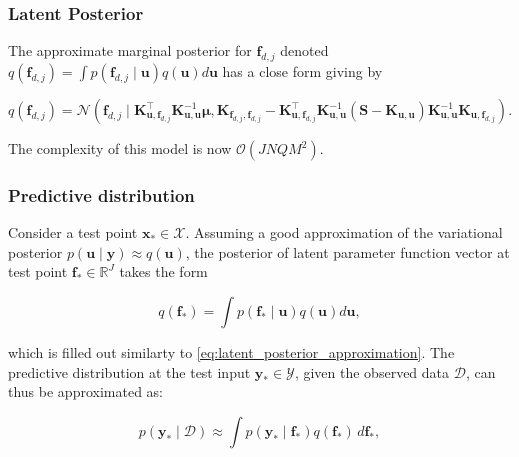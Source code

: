 \subsubsection{Latent Posterior}

The approximate marginal posterior for $\boldsymbol{f}_{d,j}$ denoted $q(\boldsymbol{f}_{d,j}) = \int p(\mathbf{f}_{d,j} \mid \boldsymbol{u})q(\boldsymbol{u})d\boldsymbol{u}$ has a close form giving by 

\begin{equation}\label{eq:latent_posterior_approximation}
	q(\boldsymbol{f}_{d,j}) = \mathcal{N}\left(\boldsymbol{f}_{d,j} \mid \boldsymbol{K}_{\boldsymbol{u}, \boldsymbol{f}_{d,j}}^\top \boldsymbol{K}_{\boldsymbol{u}, \boldsymbol{u}}^{-1} \boldsymbol{\mu}, \boldsymbol{K}_{\boldsymbol{f}_{d,j}, \boldsymbol{f}_{d,j}} - \mathbf{K}_{\boldsymbol{u}, \boldsymbol{f}_{d,j}}^\top \boldsymbol{K}_{\boldsymbol{u}, \boldsymbol{u}}^{-1} (\boldsymbol{S} - \boldsymbol{K}_{\boldsymbol{u}, \mathbf{u}}) \mathbf{K}_{\mathbf{u}, \boldsymbol{u}}^{-1} \boldsymbol{K}_{\boldsymbol{u}, \boldsymbol{f}_{d,j}} \right).
\end{equation}

The complexity of this model is now \( \mathcal{O}(JNQM^2) \).

\subsubsection{Predictive distribution}

Consider a test point \( \boldsymbol{x}_{*} \in \mathcal{X} \). Assuming a good approximation of the variational posterior $p(\mathbf{u} \mid \mathbf{y}) \approx q(\mathbf{u})$, the posterior of latent parameter function vector at test point \( \boldsymbol{f}_* \in \mathbb{R}^{J} \) takes the form

\begin{equation}
	q(\boldsymbol{f}_*) = \int p(\boldsymbol{f}_* \mid \boldsymbol{u}) q(\boldsymbol{u}) d\boldsymbol{u},
\end{equation}

which is filled out similarty to \cref{eq:latent_posterior_approximation}. The predictive distribution at the test input \( \boldsymbol{y}_* \in \mathcal{Y} \), given the observed data \( \mathcal{D} \), can thus be approximated as:

\begin{equation}\label{eq;predictive_distribution}
	p(\boldsymbol{y}_* \mid \mathcal{D}) \approx \int p(\boldsymbol{y}_* \mid \boldsymbol{f}_*) q(\boldsymbol{f}_*) \, d\boldsymbol{f}_*,
\end{equation}

